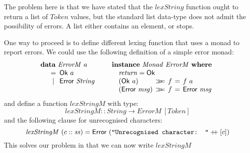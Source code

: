 \documentclass{jfp1}
\newcommand{\mbind}{\mathrel{>\kern-0.45em>\kern-0.45em=}}
\newcommand{\kw}[1]{\textbf{#1}}
\begin{document}
The problem here is that we have stated that the $\mathit{lexString}$
function ought to return a list of $\mathit{Token}$ values, but the
standard list data-type does not admit the possibility of errors. A
list either contains an element, or stops.

One way to proceed is to define different lexing function that uses a
monad to report errors. We could use the following definition of a
simple error monad:
\begin{displaymath}
  \begin{array}{ll}
    \begin{array}[t]{l}
      \kw{data}~\mathit{ErrorM}~a \\
      \quad
      \begin{array}{c@{\hspace{0.5em}}l}
        = & \mathsf{Ok}~a \\
        | & \mathsf{Error}~\mathit{String}
      \end{array}
    \end{array}
    &
    \begin{array}[t]{l}
      \kw{instance}~\mathit{Monad}~\mathit{ErrorM}~\kw{where} \\
      \quad \mathit{return} = \mathsf{Ok} \\
      \quad
      \begin{array}{@{}l@{\hspace{0.4em}}c@{\hspace{0.4em}}l@{\hspace{0.4em}}c@{\hspace{0.4em}}l}
        (\mathsf{Ok}~a) &\mbind &f &=& f~a \\
        (\mathsf{Error}~\mathit{msg}) &\mbind& f& =& \mathsf{Error}~\mathit{msg}
      \end{array}
    \end{array}
  \end{array}
\end{displaymath} %
and define a function $\mathit{lexStringM}$ with type:
\begin{displaymath}
  \mathit{lexStringM} :: \mathit{String} \to \mathit{ErrorM}~[\mathit{Token}]
\end{displaymath}
and the following clause for unrecognised characters:
\begin{displaymath}
  \mathit{lexStringM}~(c :: \mathit{ss}) = \mathsf{Error}~(\texttt{"Unrecognised character: "} \mathbin{+\!\!+} [c])
\end{displaymath}
This solves our problem in that we can now write $\mathit{lexStringM}$
\end{document}
